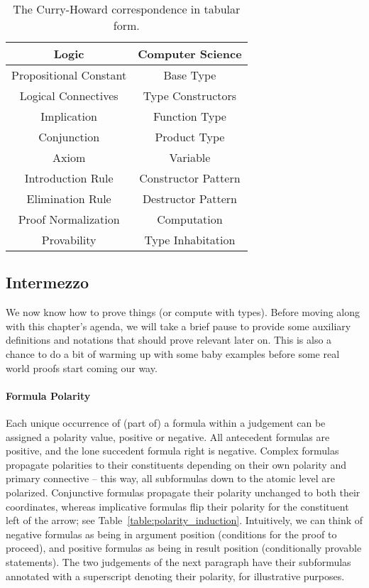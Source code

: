 \begin{table}
	\centering
	\begin{tabularx}{0.8\textwidth}{@{}CC@{}}
	\textbf{Logic}			& \textbf{Computer Science}\\
	\toprule
	Propositional Constant	& Base Type\\
	Logical Connectives 	& Type Constructors\\
	Implication				& Function Type\\
	Conjunction				& Product Type\\
	Axiom					& Variable\\
	Introduction Rule		& Constructor Pattern\\
	Elimination Rule		& Destructor Pattern\\
	Proof Normalization		& Computation\\
	Provability				& Type Inhabitation	 
	\end{tabularx}
	\caption{The Curry-Howard correspondence in tabular form.}
	\label{table:CHC}
\end{table}

\subsection{Intermezzo}
\label{subsection:utility_definitions}
We now know how to prove things (or compute with types). 
Before moving along with this chapter's agenda, we will take a brief pause to provide some auxiliary definitions and notations that should prove relevant later on.
This is also a chance to do a bit of warming up with some baby examples before some real world proofs start coming our way.


\paragraph{Formula Polarity}
Each unique occurrence of (part of) a formula within a judgement can be assigned a polarity value, positive or negative.
All antecedent formulas are positive, and the lone succedent formula right is negative.
Complex formulas propagate polarities to their constituents depending on their own polarity and primary connective -- this way, all subformulas down to the atomic level are polarized.
Conjunctive formulas propagate their polarity unchanged to both their coordinates, whereas implicative formulas flip their polarity for the constituent left of the arrow; see Table~\ref{table:polarity_induction}.
Intuitively, we can think of negative formulas as being in argument position (conditions for the proof to proceed), and positive formulas as being in result position (conditionally provable statements).
The two judgements of the next paragraph have their subformulas annotated with a superscript denoting their polarity, for illustrative purposes.


